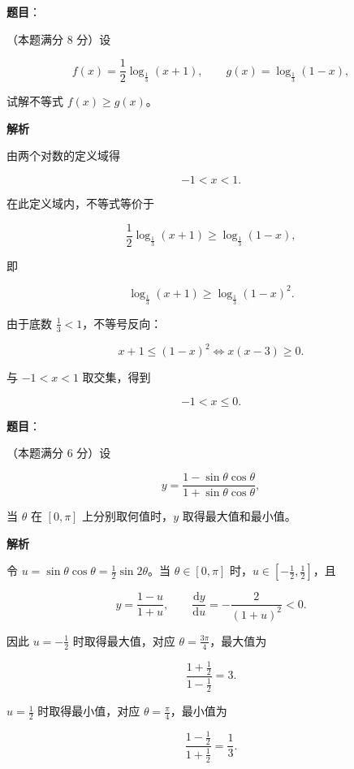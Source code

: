 \begin{answer}

\textbf{题目}：

（本题满分 8 分）设

\nopagebreak[4]
\[
f(x)=\frac12\log_{\frac13}(x+1),\qquad
g(x)=\log_{\frac13}(1-x),
\]

试解不等式 $f(x)\ge g(x)$。

\textbf{解析}

由两个对数的定义域得

\nopagebreak[4]
\[
-1<x<1.
\]

在此定义域内，不等式等价于

\nopagebreak[4]
\[
\frac12\log_{\frac13}(x+1)\ge\log_{\frac13}(1-x),
\]

即

\nopagebreak[4]
\[
\log_{\frac13}(x+1)\ge
\log_{\frac13}(1-x)^2.
\]

由于底数 $\frac13<1$，不等号反向：

\nopagebreak[4]
\[
x+1\le(1-x)^2
\Longleftrightarrow x(x-3)\ge0.
\]

与 $-1<x<1$ 取交集，得到

\nopagebreak[4]
\[
-1<x\le0.
\]


\end{answer}
\begin{answer}

\textbf{题目}：

（本题满分 6 分）设

\nopagebreak[4]
\[
y=\frac{1-\sin\theta\cos\theta}
{1+\sin\theta\cos\theta},
\]

当 $\theta$ 在 $[0,\pi]$ 上分别取何值时，$y$ 取得最大值和最小值。

\textbf{解析}

令 $u=\sin\theta\cos\theta=\frac12\sin2\theta$。当 $\theta\in[0,\pi]$ 时，$u\in[-\frac12,\frac12]$，且

\nopagebreak[4]
\[
y=\frac{1-u}{1+u},\qquad
\frac{\mathrm dy}{\mathrm du}=-\frac2{(1+u)^2}<0.
\]

因此 $u=-\frac12$ 时取得最大值，对应 $\theta=\frac{3\pi}4$，最大值为

\nopagebreak[4]
\[
\frac{1+\frac12}{1-\frac12}=3.
\]

$u=\frac12$ 时取得最小值，对应 $\theta=\frac\pi4$，最小值为

\nopagebreak[4]
\[
\frac{1-\frac12}{1+\frac12}=\frac13.
\]


\end{answer}
